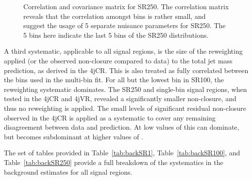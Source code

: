 
\begin{figure}[!ht]
  \centering
  
    
  \caption{Correlation and covariance matrix for SR250. The correlation matrix reveals that the correlation amongst bins is rather small, and suggest the usage of 5 separate nuisance parameters for SR250. The 5 bins here indicate the last 5 bins of the SR250 distributions.}
           
  \label{fig:search:search:systematics:SR250}
\end{figure}

A third systematic, applicable to all signal regions, is the size of the reweighting applied (or the observed non-closure compared to data) to the total jet mass prediction, as derived in the 4jCR. This is also treated as fully correlated between the bins used in the multi-bin fit.  For all but the lowest \MJ bin in SR100, the reweighting systematic dominates. The SR250 and single-bin signal regions, when tested in the 4jCR and 4jVR, revealed a significantly smaller non-closure, and thus no reweighting is applied. The small levels of significant residual non-closure observed in the 4jCR is applied as a systematic to cover any remaining disagreement between data and prediction. At low values of \MJ this can dominate, but becomes subdominant at higher values of \MJ.

The set of tables provided in Table~\ref{tab:backSR1}, Table~\ref{tab:backSR100}, and Table~\ref{tab:backSR250} provide a full breakdown of the systematics in the background estimates for all signal regions.

